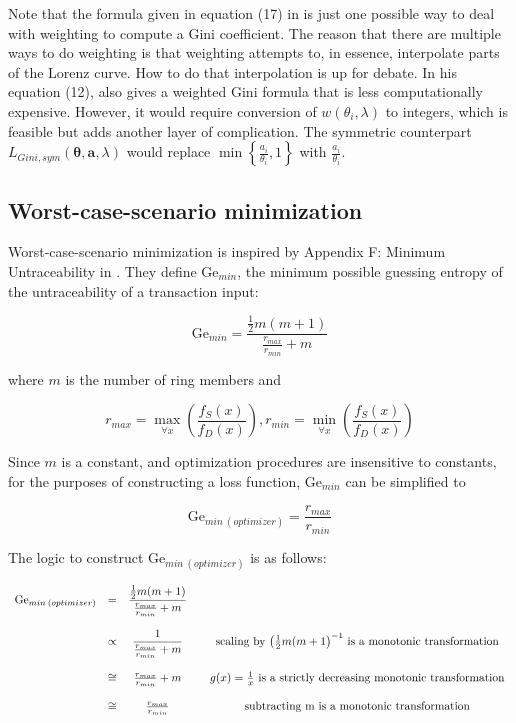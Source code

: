 \documentclass[english]{article}
\begin{document}
Note that the formula given in equation (17) in \cite{Creedy2015}
is just one possible way to deal with weighting to compute a Gini
coefficient. The reason that there are multiple ways to do weighting
is that weighting attempts to, in essence, interpolate parts of the
Lorenz curve. How to do that interpolation is up for debate. In his
equation (12), \cite{Creedy2015} also gives a weighted Gini formula
that is less computationally expensive. However, it would require
conversion of $w(\theta_{i},\lambda)$ to integers, which is feasible
but adds another layer of complication. The symmetric counterpart
$L_{Gini,sym}(\boldsymbol{\theta},\boldsymbol{a},\lambda)$ would
replace $\min\left\{ \tfrac{a_{i}}{\theta_{i}},1\right\} $ with $\tfrac{a_{i}}{\theta_{i}}$.

\subsection{Worst-case-scenario minimization}

Worst-case-scenario minimization is inspired by Appendix F: Minimum
Untraceability in \cite{2018}. They define $\mathrm{Ge}{}_{min}$,
the minimum possible guessing entropy of the untraceability of a transaction
input:

\begin{equation}
\mathrm{Ge}{}_{min}=\dfrac{\tfrac{1}{2}m(m+1)}{\frac{r_{max}}{r_{min}}+m}\label{eq:Ge_min_orig}
\end{equation}

where $m$ is the number of ring members and

\[
r_{max}=\underset{\forall x}{\max}\left(\dfrac{f_{S}(x)}{f_{D}(x)}\right),r_{min}=\underset{\forall x}{\min}\left(\dfrac{f_{S}(x)}{f_{D}(x)}\right)
\]

Since $m$ is a constant, and optimization procedures are insensitive
to constants, for the purposes of constructing a loss function, $\mathrm{Ge}{}_{min}$
can be simplified to 

\begin{equation}
\mathrm{Ge}{}_{min\:(optimizer)}=\frac{r_{max}}{r_{min}}\label{eq:Ge_min_optimizer}
\end{equation}

The logic to construct $\mathrm{Ge}{}_{min\:(optimizer)}$ is as follows:

\[
\begin{array}{ccccc}
\mathrm{Ge}{}_{min\:(optimizer)} & = & \dfrac{\tfrac{1}{2}m(m+1)}{\tfrac{r_{max}}{r_{min}}+m}\\
\\
 & \propto & \dfrac{1}{\tfrac{r_{max}}{r_{min}}+m} &  & \textrm{scaling by \ensuremath{\left(\tfrac{1}{2}m(m+1\right)^{-1}} is a monotonic transformation}\\
\\
 & \cong & \tfrac{r_{max}}{r_{min}}+m &  & g(x)=\frac{1}{x}\textrm{ is a strictly decreasing monotonic transformation}\\
\\
 & \cong & \tfrac{r_{max}}{r_{min}} &  & \textrm{subtracting m is a monotonic transformation}
\end{array}
\]
\end{document}
